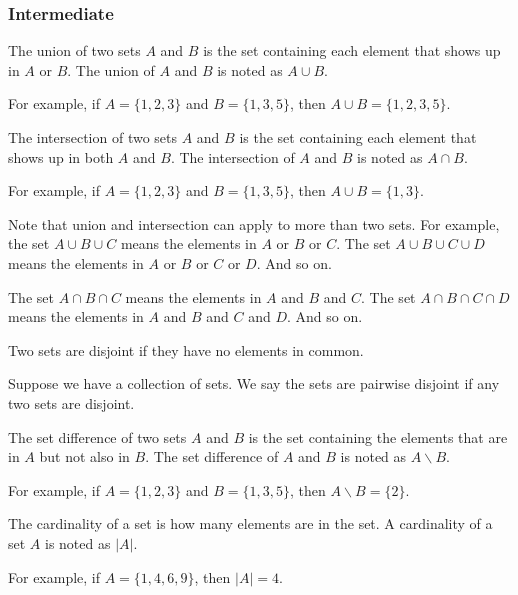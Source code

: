 \documentclass[11pt]{scrartcl}
\begin{document}
\subsubsection{Intermediate}

\begin{definition}
The union of two sets $A$ and $B$ is the set containing each element that shows up in $A$ or $B$. The union of $A$ and $B$ is noted as $A \cup B$.
\end{definition}
For example, if $A = \{1, 2, 3\}$ and $B = \{1, 3, 5\}$, then $A \cup B = \{1, 2, 3, 5\}$.

\begin{definition}
The intersection of two sets $A$ and $B$ is the set containing each element that shows up in both $A$ and $B$. The intersection of $A$ and $B$ is noted as $A \cap B$.
\end{definition}
For example, if $A = \{1, 2, 3\}$ and $B = \{1, 3, 5\}$, then $A \cup B = \{1, 3\}$.

Note that union and intersection can apply to more than two sets. For example, the set $A \cup B \cup C$ means the elements in $A$ or $B$ or $C$. The set $A \cup B \cup C \cup D$ means the elements in $A$ or $B$ or $C$ or $D$. And so on.

The set $A \cap B \cap C$ means the elements in $A$ and $B$ and $C$. The set $A \cap B \cap C \cap D$ means the elements in $A$ and $B$ and $C$ and $D$. And so on.

\begin{definition}[Disjoint]
    Two sets are disjoint if they have no elements in common.
\end{definition}

\begin{definition}
    Suppose we have a collection of sets. We say the sets are pairwise disjoint if any two sets are disjoint.
\end{definition}

\begin{definition}
The set difference of two sets $A$ and $B$ is the set containing the elements that are in $A$ but not also in $B$. The set difference of $A$ and $B$ is noted as $A \backslash B$.
\end{definition}
For example, if $A = \{1, 2, 3\}$ and $B = \{1, 3, 5\}$, then $A \backslash B = \{2\}$.

\begin{definition}[Cardinality]
The cardinality of a set is how many elements are in the set. A cardinality of a set $A$ is noted as $|A|$.
\end{definition}
For example, if $A = \{1, 4, 6, 9\}$, then $|A| = 4$.
\end{document}
